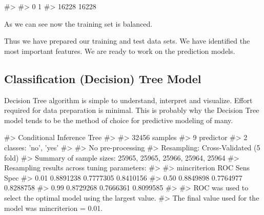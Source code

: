 \begin{Schunk}
\begin{Soutput}
#> 
#>     0     1 
#> 16228 16228
\end{Soutput}
\end{Schunk}

As we can see now the training set is balanced.

Thus we have prepared our training and test data sets. We have
identified the most important features. We are ready to work on the
prediction models.

\hypertarget{classification-decision-tree-model}{%
\subsection{Classification (Decision) Tree
Model}\label{classification-decision-tree-model}}

Decision Tree algorithm is simple to understand, interpret and
visualize. Effort required for data preparation is minimal. This is
probably why the Decision Tree model tends to be the method of choice
for predictive modeling of many.

\begin{Schunk}
\begin{Soutput}
#> Conditional Inference Tree 
#> 
#> 32456 samples
#>     9 predictor
#>     2 classes: 'no', 'yes' 
#> 
#> No pre-processing
#> Resampling: Cross-Validated (5 fold) 
#> Summary of sample sizes: 25965, 25965, 25966, 25964, 25964 
#> Resampling results across tuning parameters:
#> 
#>   mincriterion  ROC        Sens       Spec     
#>   0.01          0.8891238  0.7777305  0.8410156
#>   0.50          0.8849898  0.7764977  0.8288758
#>   0.99          0.8729268  0.7666361  0.8099585
#> 
#> ROC was used to select the optimal model using the largest value.
#> The final value used for the model was mincriterion = 0.01.
\end{Soutput}
\end{Schunk}

